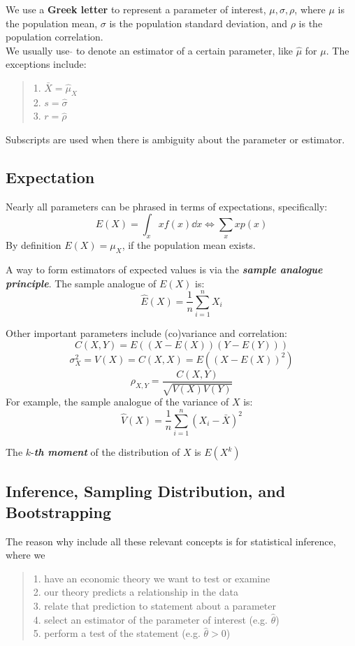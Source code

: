 We use a \textbf{Greek letter} to represent a parameter of interest, $\mu, \sigma, \rho$, where $\mu$ is the population mean, $\sigma$ is the population standard deviation, and $\rho$ is the population correlation. \\
We usually use $\hat{}$ to denote an estimator of a certain parameter, like $\hat{\mu}$ for $\mu$. The exceptions include:
\begin{quote}
    1. $\bar{X} = \hat{\mu}_X$ \\
    2. $s = \hat{\sigma}$ \\
    3. $r = \hat{\rho}$
\end{quote}
Subscripts are used when there is ambiguity about the parameter or estimator.

\subsection{Expectation}
Nearly all parameters can be phrased in terms of expectations, specifically:
$$E(X) = \int_x xf(x) \dd x \iff \sum_x x p(x)$$
By definition $E(X) = \mu_X$, if the population mean exists.

A way to form estimators of expected values is via the \textbf{\textit{sample analogue principle}}. The sample analogue of $E(X)$ is:
$$\hat{E}(X) = \frac{1}{n} \sum_{i = 1}^{n} X_i$$

Other important parameters include (co)variance and correlation:
$$C(X, Y) = E((X - E(X))(Y - E(Y)))$$
$$\sigma^2_X = V(X) = C(X, X) = E((X - E(X))^2)$$
$$\rho_{X, Y} = \frac{C(X, Y)}{\sqrt{V(X)V(Y)}}$$
For example, the sample analogue of the variance of $X$ is:
$$\hat{V}(X) = \frac{1}{n} \sum_{i = 1}^{n} (X_i - \bar{X})^2$$

\begin{definition}
    The $k$-\textbf{\textit{th moment}} of the distribution of $X$ is $E(X^k)$
\end{definition}

\subsection{Inference, Sampling Distribution, and Bootstrapping}
The reason why include all these relevant concepts is for statistical inference, where we 
\begin{quote}
    1. have an economic theory we want to test or examine \\
    2. our theory predicts a relationship in the data \\
    3. relate that prediction to statement about a parameter \\
    4. select an estimator of the parameter of interest (e.g. $\hat{\theta}$) \\
    5. perform a test of the statement (e.g. $\hat{\theta} > 0$)
\end{quote}

